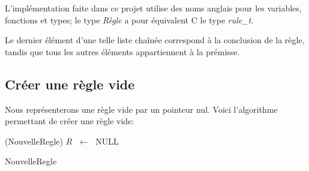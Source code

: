 \documentclass[12pt]{article}
\newcommand{\Assign}[2]{#1 $\; \longleftarrow \;$ #2}
\begin{document}



L'implémentation faite dans ce projet utilise des noms anglais pour les variables, fonctions et types; le type \textit{Règle} a pour équivalent C le type \textit{rule\_t}.

Le dernier élément d'une telle liste chaînée correspond à la conclusion de la règle, tandis que tous les autres éléments appartiennent à la prémisse.

\subsection{Créer une règle vide}

Nous représenterons une règle vide par un pointeur nul.
Voici l'algorithme permettant de créer une règle vide:

\begin{algorithm}[H]
\DontPrintSemicolon
\SetAlgoLined
{}

\Begin(NouvelleRegle){
  \Assign{$R$}{NULL}
}

\caption{NouvelleRegle\label{NR}}
\end{algorithm}
\end{document}
